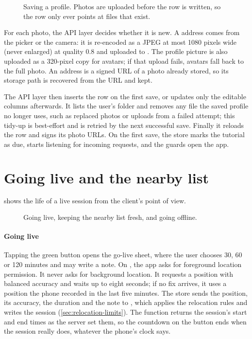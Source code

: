 \begin{figure}[ht]
  \centering
  
  \caption{Saving a profile. Photos are uploaded before the row is written, so the row only ever points
    at files that exist.}
  \label{fig:seq-profile}
\end{figure}

For each photo, the API layer decides whether it is new. A  address comes from the picker
or the camera: it is re-encoded as a JPEG at most 1080 pixels wide (never enlarged) at quality 0.8 and
uploaded to . The profile picture is also uploaded as a
320-pixel copy for avatars; if that upload fails, avatars fall back to the full photo. An
 address is a signed URL of a photo already stored, so its storage path is recovered from
the URL and kept.

The API layer then inserts the row on the first save, or updates only the editable columns afterwards.
It lists the user's folder and removes any file the saved profile no longer uses, such as replaced photos
or uploads from a failed attempt; this tidy-up is best-effort and is retried by the next successful save.
Finally it reloads the row and signs its photo URLs. On the first save, the store marks the tutorial as
due, starts listening for incoming requests, and the guards open the app.

\section{Going live and the nearby list}
\label{sec:flow-live}

 shows the life of a live session from the client's point of view.

\begin{figure}[ht]
  \centering
  
  \caption{Going live, keeping the nearby list fresh, and going offline.}
  \label{fig:seq-live}
\end{figure}

\paragraph{Going live} Tapping the green  button opens the go-live sheet, where the user chooses
30, 60 or 120 minutes and may write a note. On , the app asks for foreground location
permission. It never asks for background location. It requests a position with balanced accuracy and
waits up to eight seconds; if no fix arrives, it uses a position the phone recorded in the last five
minutes. The store sends the position, its accuracy, the duration and the note to , which
applies the relocation rules and writes the session (\cref{sec:relocation-limits}). The function returns
the session's start and end times as the server set them, so the countdown on the button ends when the
session really does, whatever the phone's clock says.

